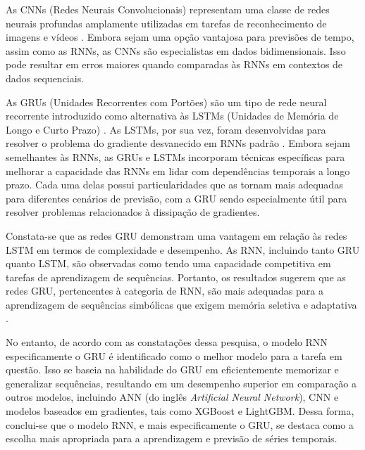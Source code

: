 As CNNs (Redes Neurais Convolucionais) representam uma classe de redes neurais profundas amplamente utilizadas em tarefas de reconhecimento de imagens e vídeos \cite{cnn}. Embora sejam uma opção vantajosa para previsões de tempo, assim como as RNNs, as CNNs são especialistas em dados bidimensionais. Isso pode resultar em erros maiores quando comparadas às RNNs em contextos de dados sequenciais.

As GRUs (Unidades Recorrentes com Portões)  são um tipo de rede neural recorrente introduzido como alternativa às LSTMs (Unidades de Memória de Longo e Curto Prazo) \cite{gru}. As LSTMs, por sua vez, foram desenvolvidas para resolver o problema do gradiente desvanecido em RNNs padrão \cite{lstm}. Embora sejam semelhantes às RNNs, as GRUs e LSTMs incorporam técnicas específicas para melhorar a capacidade das RNNs em lidar com dependências temporais a longo prazo. Cada uma delas possui particularidades que as tornam mais adequadas para diferentes cenários de previsão, com a GRU sendo especialmente útil para resolver problemas relacionados à dissipação de gradientes.


Constata-se que as redes GRU demonstram uma vantagem em relação às redes LSTM em termos de complexidade e desempenho. As RNN, incluindo tanto GRU quanto LSTM, são observadas como tendo uma capacidade competitiva em tarefas de aprendizagem de sequências. Portanto, os resultados sugerem que as redes GRU, pertencentes à categoria de RNN, são mais adequadas para a aprendizagem de sequências simbólicas que exigem memória seletiva e adaptativa \cite{DBLP:journals/corr/abs-2107-02248}.

No entanto, de acordo com as constatações dessa pesquisa, o modelo RNN especificamente o GRU é identificado como o melhor modelo para a tarefa em questão. Isso se baseia na habilidade do GRU em eficientemente memorizar e generalizar sequências, resultando em um desempenho superior em comparação a outros modelos, incluindo ANN (do inglês \textit{Artificial Neural Network}), CNN e modelos baseados em gradientes, tais como XGBoost e LightGBM. Dessa forma, conclui-se que o modelo RNN, e mais especificamente o GRU, se destaca como a escolha mais apropriada para a aprendizagem e previsão de séries temporais.



